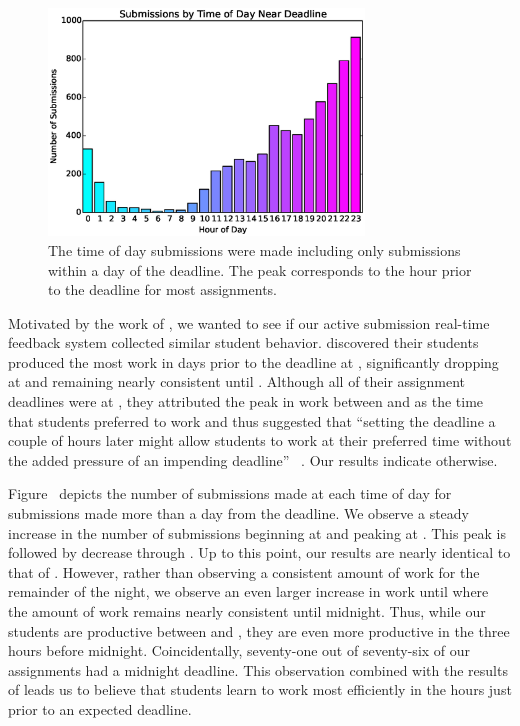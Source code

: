 \begin{figure}[!t]
\centering \includegraphics[width=3.3in]{graphs/Submissions_by_Time_of_Day_Near_Deadline.eps}
\caption{The time of day submissions were made including only submissions
  within a day of the deadline. The  peak corresponds to the hour prior
  to the deadline for most assignments.}
\end{figure}

Motivated by the work of \spacco{}, we wanted to see if our active submission
real-time feedback system collected similar student behavior. \spacco{}
discovered their students produced the most work in days prior to the deadline
at , significantly dropping at  and remaining nearly consistent
until . Although all of their assignment deadlines were at , they
attributed the peak in work between  and  as the time that students
preferred to work and thus suggested that ``setting the deadline a couple of
hours later might allow students to work at their preferred time without the
added pressure of an impending deadline''
~\cite{Spacco:2013:TIP:2462476.2465594}. Our results indicate otherwise.

Figure~ depicts the number of submissions made at
each time of day for submissions made more than a day from the deadline. We
observe a steady increase in the number of submissions beginning at  and
peaking at . This peak is followed by decrease through . Up to this
point, our results are nearly identical to that of \spacco{}. However, rather
than observing a consistent amount of work for the remainder of the night, we
observe an even larger increase in work until  where the amount of work
remains nearly consistent until midnight. Thus, while our students are
productive between  and , they are even more productive in the
three hours before midnight. Coincidentally, seventy-one out of seventy-six of
our assignments had a midnight deadline. This observation combined with the
results of \spacco{} leads us to believe that students learn to work most
efficiently in the hours just prior to an expected deadline.

